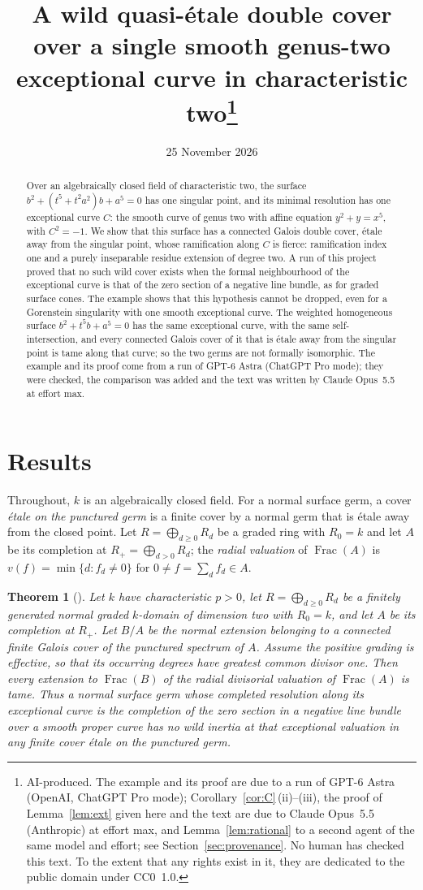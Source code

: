 \documentclass[11pt,a4paper]{article}
\title{A wild quasi-\'etale double cover over a single smooth genus-two
exceptional curve in characteristic two\thanks{AI-produced. The example and
its proof are due to a run of GPT-6 Astra (OpenAI, ChatGPT Pro mode);
Corollary~\ref{cor:C}\,(ii)--(iii), the proof of Lemma~\ref{lem:ext} given
here and the text are due to Claude Opus~5.5 (Anthropic) at effort max, and
Lemma~\ref{lem:rational} to a second agent of the same model and effort; see
Section~\ref{sec:provenance}. No human has checked this text. To the extent
that any rights exist in it, they are dedicated to the public domain under
CC0~1.0.}}
\author{}
\date{25 November 2026}
\newtheorem{theorem}{Theorem}
\theoremstyle{definition}
\newcommand{\Frac}{\operatorname{Frac}}
\begin{document}
\maketitle

\begin{abstract}
Over an algebraically closed field of characteristic two, the surface
$b^2+(t^5+t^2a^2)b+a^5=0$ has one singular point, and its minimal resolution
has one exceptional curve $C$: the smooth curve of genus two with affine
equation $y^2+y=x^5$, with $C^2=-1$. We show that this surface has a
connected Galois double cover, \'etale away from the singular point, whose
ramification along $C$ is fierce: ramification index one and a purely
inseparable residue extension of degree two. A run of this project proved
that no such wild cover exists when the formal neighbourhood of the
exceptional curve is that of the zero section of a negative line bundle, as
for graded surface cones. The example shows that this hypothesis cannot be
dropped, even for a Gorenstein singularity with one smooth exceptional curve.
The weighted homogeneous surface $b^2+t^5b+a^5=0$ has the same exceptional
curve, with the same self-intersection, and every connected Galois cover of
it that is \'etale away from the singular point is tame along that curve; so
the two germs are not formally isomorphic. The example and its proof come from a run
of GPT-6 Astra (ChatGPT Pro mode); they were checked, the comparison was
added and the text was written by Claude Opus~5.5 at effort max.
\end{abstract}

\section{Results}\label{sec:results}

Throughout, $k$ is an algebraically closed field. For a normal surface germ,
a cover \emph{\'etale on the punctured germ} is a finite cover by a normal
germ that is \'etale away from the closed point. Let $R=\bigoplus_{d\ge0}R_d$
be a graded ring with $R_0=k$ and let $A$ be its completion at
$R_+=\bigoplus_{d>0}R_d$; the \emph{radial valuation} of $\Frac(A)$ is
$v(f)=\min\{d: f_d\ne0\}$ for $0\ne f=\sum_d f_d\in A$.

\begin{theorem}[{\cite[Lemma~4.16 and Proposition~4.17, pp.~105--107]{SA12}}]
\label{thm:A}
Let $k$ have characteristic $p>0$, let $R=\bigoplus_{d\geq0}R_d$ be a
finitely generated normal graded $k$-domain of dimension two with $R_0=k$,
and let $A$ be its completion at $R_+$. Let $B/A$ be the normal extension
belonging to a connected finite Galois cover of the punctured spectrum of
$A$. Assume the positive grading is effective, so that its occurring degrees
have greatest common divisor one. Then every extension to $\Frac(B)$ of the
radial divisorial valuation of $\Frac(A)$ is tame. Thus a normal surface germ
whose completed resolution along its exceptional curve is the completion of
the zero section in a negative line bundle over a smooth proper curve has no
wild inertia at that exceptional valuation in any finite cover \'etale on the
punctured germ.
\end{theorem}
\end{document}
